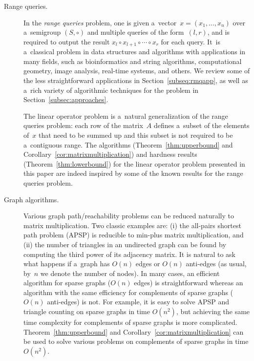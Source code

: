 \documentclass[a4paper,UKenglish,cleveref, autoref]{lipics-v2019}
\begin{document}
\begin{description}
\item[Range queries.] In the \emph{range queries} problem,
one is given a~vector~$x=(x_1, \dotsc, x_n)$ over a~semigroup $(S, \circ)$ and
multiple queries of the form~$(l,r)$, and is required to
output the result $x_l \circ x_{l+1} \circ \dotsb \circ x_r$
for each query. It~is a~classical problem in data structures and
algorithms with applications in many fields, such as bioinformatics and
string algorithms, computational geometry, image analysis, real-time
systems, and others. We review some of the less straightforward applications in Section~\ref{subseq:rmqapp},
as well as a~rich variety of algorithmic techniques for the problem in
Section~\ref{subsec:approaches}.

The linear operator problem is a~natural generalization of the range queries
problem: each row of the matrix~$A$ defines a~subset of the elements of~$x$
that need to be summed up and this subset is not required to be
a~contiguous range. The algorithms (Theorem~\ref{thm:upperbound} and
Corollary~\ref{cor:matrixmultiplication}) and hardness results
(Theorem~\ref{thm:lowerbound}) for the linear operator problem presented in this
paper are indeed inspired by some of the known results for the range queries
problem.

\item[Graph algorithms.] Various graph path/reachability
problems can be reduced naturally to matrix multiplication.
Two classic examples are: (i) the all-pairs shortest path problem (APSP) is
reducible to min-plus matrix multiplication, and (ii) the number of triangles
in an undirected graph can be found by computing the third power of its
adjacency matrix.
It is natural to ask what happens if
a~graph has $O(n)$ edges or $O(n)$ anti-edges
(as usual, by~$n$ we denote the number of nodes).
In many cases, an efficient algorithm
for sparse graphs ($O(n)$ edges) is straightforward
whereas an algorithm with the same efficiency
for complements of sparse graphs ($O(n)$ anti-edges) is not. For
example, it is easy to solve APSP and triangle counting on sparse graphs in
time $O(n^2)$, but achieving the same time complexity for complements of sparse
graphs is more complicated.
Theorem~\ref{thm:upperbound} and Corollary~\ref{cor:matrixmultiplication} can be
used to solve various problems on complements of sparse graphs in time $O(n^2)$.


\end{description}
\end{document}
